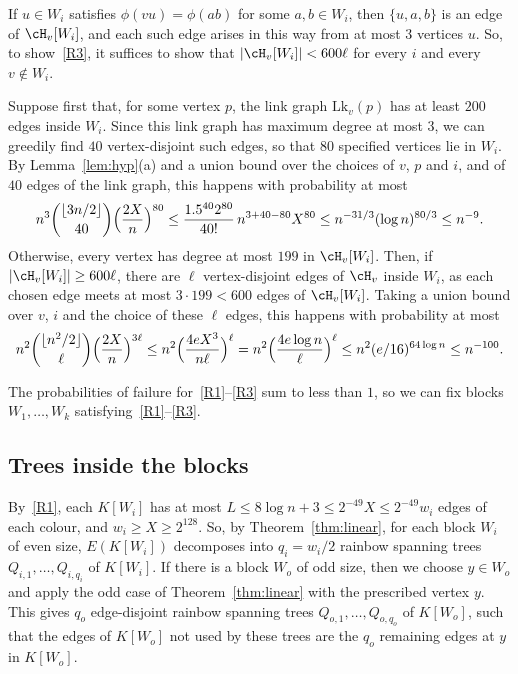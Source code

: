 If $u\in W_i$ satisfies $\phi(vu)=\phi(ab)$ for some $a,b\in W_i$, then $\{u,a,b\}$ is an edge of $\cH_v[W_i]$, and each such edge arises in this way from at most $3$ vertices $u$. So, to show~\ref{R3}, it suffices to show that $|\cH_v[W_i]|<600\ell$ for every $i$ and every $v\notin W_i$.

Suppose first that, for some vertex $p$, the link graph $\mathrm{Lk}_v(p)$ has at least $200$ edges inside $W_i$. Since this link graph has maximum degree at most $3$, we can greedily find $40$ vertex-disjoint such edges, so that $80$ specified vertices lie in $W_i$. By Lemma~\ref{lem:hyp}(a) and a union bound over the choices of $v$, $p$ and $i$, and of $40$ edges of the link graph, this happens with probability at most
\[n^3\binom{\lfloor3n/2\rfloor}{40}\Bigl(\frac{2X}n\Bigr)^{80}\le\frac{1.5^{40}2^{80}}{40!}\,n^{3+40-80}X^{80}\le n^{-31/3}(\log n)^{80/3}\le n^{-9}.\]
Otherwise, every vertex has degree at most $199$ in $\cH_v[W_i]$. Then, if $|\cH_v[W_i]|\ge600\ell$, there are $\ell$ vertex-disjoint edges of $\cH_v$ inside $W_i$, as each chosen edge meets at most $3\cdot199<600$ edges of $\cH_v[W_i]$. Taking a union bound over $v$, $i$ and the choice of these $\ell$ edges, this happens with probability at most
\[n^2\binom{\lfloor n^2/2\rfloor}{\ell}\Bigl(\frac{2X}{n}\Bigr)^{3\ell}\le n^2\Bigl(\frac{4eX^3}{n\ell}\Bigr)^\ell=n^2\Bigl(\frac{4e\log n}{\ell}\Bigr)^\ell\le n^2(e/16)^{64\log n}\le n^{-100}.\]

The probabilities of failure for~\ref{R1}--\ref{R3} sum to less than $1$, so we can fix blocks $W_1,\ldots,W_k$ satisfying~\ref{R1}--\ref{R3}.

\subsection{Trees inside the blocks}\label{sec:inside}
By~\ref{R1}, each $K[W_i]$ has at most $L\le 8\log n+3\le2^{-49}X\le2^{-49}w_i$ edges of each colour, and $w_i\ge X\ge2^{128}$.
So, by Theorem~\ref{thm:linear}, for each block $W_i$ of even size, $E(K[W_i])$ decomposes into $q_i=w_i/2$ rainbow spanning trees $Q_{i,1},\dots,Q_{i,q_i}$ of $K[W_i]$.
If there is a block $W_o$ of odd size, then we choose $y\in W_o$ and apply the odd case of Theorem~\ref{thm:linear} with the prescribed vertex $y$. This gives $q_o$ edge-disjoint rainbow spanning trees $Q_{o,1},\ldots,Q_{o,q_o}$ of $K[W_o]$, such that the edges of $K[W_o]$ not used by these trees are the $q_o$ remaining edges at $y$ in $K[W_o]$.

